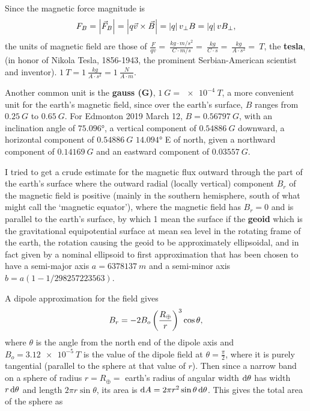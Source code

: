 Since the magnetic force magnitude is
\begin{equation}
F_B = \left| \vec{F}_B \right| = \left| q \vec{v} \times \vec{B} \right| = \left| q \right| v_\perp B = \left| q \right| v B_\perp ,
\end{equation}
the units of magnetic field are those of $\frac{F}{qv} = \SI{}{\frac{kg \cdot m/s^2}{C \cdot m/s} = \SI{}{\frac{kg}{C \cdot s}} = \SI{}{\frac{kg}{A \cdot s^2}} = \SI{}{T}}$, the \textbf{tesla}, (in honor of Nikola Tesla, 1856-1943, the prominent Serbian-American scientist and inventor). $\SI{1}{T} = \SI{1}{\frac{kg}{A \cdot s^2}} = \SI{1}{\frac{N}{A \cdot m}}$. 

Another common unit is the \textbf{gauss (G)}, $\SI{1}{G} = \SI{e-4}{T}$, a more convenient unit for the earth's magnetic field, since over the earth's surface, $B$ ranges from $\SI{0.25}{G}$ to $\SI{0.65}{G}$. For Edmonton 2019 March 12, $B = \SI{0.56797}{G}$, with an inclination angle of $\ang{75.096}$, a vertical component of $\SI{0.54886}{G}$ downward, a horizontal component of $\SI{0.54886}{G}$ $\ang{14.094}$ E of north, given a northward component of $\SI{0.14169}{G}$ and an eastward component of $\SI{0.03557}{G}$.

I tried to get a crude estimate for the magnetic flux outward through the part of the earth's surface where the outward radial (locally vertical) component $B_r$ of the magnetic field is positive (mainly in the southern hemisphere, south of what might call the `magnetic equator'), where the magnetic field has $B_r = 0$ and is parallel to the earth's surface, by which 1 mean the surface if the \textbf{geoid} which is the gravitational equipotential surface at mean sea level in the rotating frame of the earth, the rotation causing the geoid to be approximately ellipsoidal, and in fact given by a nominal ellipsoid to first approximation that has been chosen to have a semi-major axis $a = \SI{6378137}{m}$ and a semi-minor axis $b=a(1-1/298257223563)$.

A dipole approximation for the field gives
\begin{equation}
B_r = -2B_o\left(\frac{R_\oplus}{r}\right)^3 \cos \theta,
\end{equation}
where $\theta$ is the angle from the north end of the dipole axis and $B_o = \SI{3.12e-5}{T}$ is the value of the dipole field at $\theta = \frac{\pi}{2}$, where it is purely tangential (parallel to the sphere at that value of $r$). Then since a narrow band on a sphere of radius $r = R_\oplus =$ earth's radius of angular width $\operatorname{d\!} \theta$ has width $r \operatorname{d\!} \theta$ and length $2 \pi r \sin \theta$, its area is $\operatorname{d\!} A = 2 \pi r^2 \sin \theta \operatorname{d\!} \theta$. This gives the total area of the sphere as